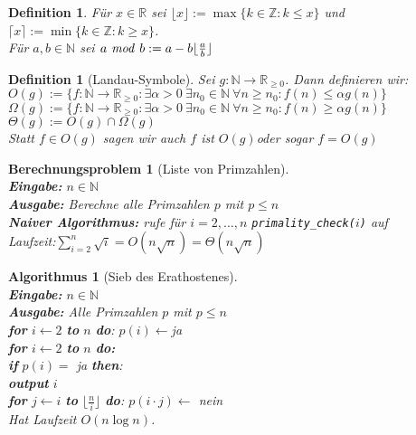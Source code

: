 \documentclass[12pt,a4paper]{article}
\theoremstyle{plain}
\newtheorem{Definition}[Theorem]{Definition}
\newtheorem{Algorithmus}[Theorem]{Algorithmus}
\newtheorem{Berechnungsproblem}[Theorem]{Berechnungsproblem}
\newcommand{\N}{\mathbb{N}}
\numberwithin{equation}{section}
\begin{document}
\begin{Definition}
Für $x\in \mathbb{R}$ sei $\lfloor x \rfloor := \max\{k\in \mathbb{Z}: k\leq x\}$ und $\lceil x\rceil := \min\{k\in \mathbb{Z}: k\geq x\}$.\\
Für $a,b\in \mathbb{N}$ sei $a\text{\emph{ mod }}b := a-b\lfloor\frac{a}{b}\rfloor$
\end{Definition}
\begin{Definition}[Landau-Symbole]
Sei $g: \mathbb{N} \rightarrow \mathbb{R}_{\geq 0}$. Dann definieren wir: \\
$O(g):=\{f:\mathbb{N}\rightarrow\mathbb{R}_{\geq 0}: \exists \alpha >0\ \exists n_0 \in \mathbb{N}\ \forall n\geq n_0: f(n)\leq \alpha g(n)\}$ \\
$\Omega(g):=\{f:\mathbb{N}\rightarrow\mathbb{R}_{\geq 0}: \exists \alpha >0\ \exists n_0 \in \mathbb{N}\ \forall n\geq n_0: f(n)\geq \alpha g(n)\}$\\
$\Theta(g):=O(g)\cap\Omega(g)$ \\
Statt $f\in O(g)$ sagen wir auch \glqq $f$ ist $O(g)$\grqq oder sogar \glqq$f=O(g)$\grqq
\end{Definition}
\begin{Berechnungsproblem}[Liste von Primzahlen]\\
\textbf{Eingabe:} $n \in \N$ \\
\textbf{Ausgabe:} Berechne alle Primzahlen $p$ mit $p\leq n$\\
\textbf{Naiver Algorithmus:} rufe für $i=2,\ldots,n$ \texttt{primality\_check($i$)} auf\\
Laufzeit:$\sum_{i=2}^n \sqrt{i}=O(n\sqrt{n})=\Theta(n\sqrt{n})$
\end{Berechnungsproblem}
\begin{Algorithmus}[Sieb des Erathostenes]\\
\textbf{Eingabe:} $n \in \N$\\
\textbf{Ausgabe:} Alle Primzahlen $p$ mit $p\leq n$\\
\textbf{for} $i \leftarrow 2$ \textbf{to} $n$ \textbf{do}: $p(i) \leftarrow$ja\\
\textbf{for} $i\leftarrow 2$ \textbf{to} $n$ \textbf{do:}\\
\text{\qquad}\textbf{if} $p(i)=$ ja \textbf{then}:\\
\text{\qquad \qquad}\textbf{output} $i$\\
\text{\qquad \qquad}\textbf{for} $j\leftarrow i$ \textbf{to} $\lfloor\frac{n}{i}\rfloor$ \textbf{do}: $p(i\cdot j) \leftarrow$ nein \\
Hat Laufzeit $O(n\log n)$.
\end{Algorithmus}
\end{document}
